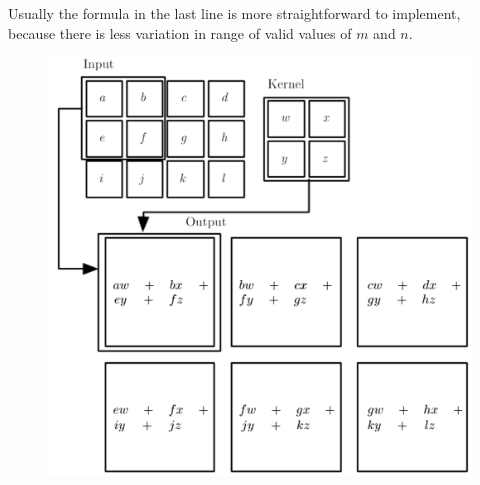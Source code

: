 \begin{multicols}{2}
	Usually the formula in the last line is more straightforward to implement, because there is less variation in range of valid values of $m$ and $n$.
	\begin{figure}[H]
		\centering
		\includegraphics[width=0.65\linewidth]{images/2dconv.PNG}
	\end{figure}

\end{multicols}
